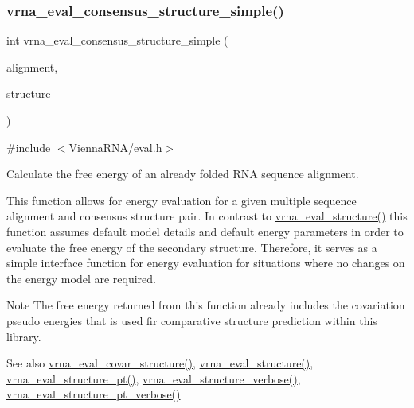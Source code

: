 \subsubsection{\texorpdfstring{vrna\+\_\+eval\+\_\+consensus\+\_\+structure\+\_\+simple()}{vrna\_eval\_consensus\_structure\_simple()}}
{\footnotesize\ttfamily int vrna\+\_\+eval\+\_\+consensus\+\_\+structure\+\_\+simple (\begin{DoxyParamCaption}\item[{const char $\ast$$\ast$}]{alignment,  }\item[{const char $\ast$}]{structure }\end{DoxyParamCaption})}



{\ttfamily \#include $<$\mbox{\hyperlink{eval_8h}{Vienna\+R\+N\+A/eval.\+h}}$>$}



Calculate the free energy of an already folded R\+NA sequence alignment. 

This function allows for energy evaluation for a given multiple sequence alignment and consensus structure pair. In contrast to \mbox{\hyperlink{group__eval_ga58f199f1438d794a265f3b27fc8ea631}{vrna\+\_\+eval\+\_\+structure()}} this function assumes default model details and default energy parameters in order to evaluate the free energy of the secondary structure. Therefore, it serves as a simple interface function for energy evaluation for situations where no changes on the energy model are required.

\begin{DoxyNote}{Note}
The free energy returned from this function already includes the covariation pseudo energies that is used fir comparative structure prediction within this library.
\end{DoxyNote}
\begin{DoxySeeAlso}{See also}
\mbox{\hyperlink{group__eval_ga6cea75c0eb9857fb59172be54cab09e0}{vrna\+\_\+eval\+\_\+covar\+\_\+structure()}}, \mbox{\hyperlink{group__eval_ga58f199f1438d794a265f3b27fc8ea631}{vrna\+\_\+eval\+\_\+structure()}}, \mbox{\hyperlink{group__eval_gadbd09372ddfd7a450bbd590c96a6bfe4}{vrna\+\_\+eval\+\_\+structure\+\_\+pt()}}, \mbox{\hyperlink{group__eval_ga0928d699d310178f84ee2351034e5cb5}{vrna\+\_\+eval\+\_\+structure\+\_\+verbose()}}, \mbox{\hyperlink{group__eval_ga8a517cfeeae8c376ae7b1e0c401d38b4}{vrna\+\_\+eval\+\_\+structure\+\_\+pt\+\_\+verbose()}}
\end{DoxySeeAlso}

